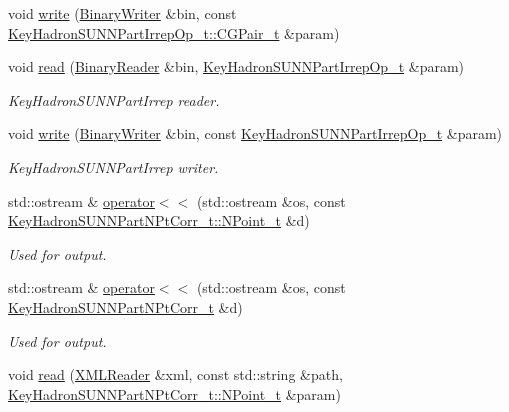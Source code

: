 \begin{DoxyCompactItemize}
\item 
void \mbox{\hyperlink{namespaceHadron_a53c6ec066bb836eb7474a8a18be8fea7}{write}} (\mbox{\hyperlink{classADATIO_1_1BinaryWriter}{Binary\+Writer}} \&bin, const \mbox{\hyperlink{structHadron_1_1KeyHadronSUNNPartIrrepOp__t_1_1CGPair__t}{Key\+Hadron\+S\+U\+N\+N\+Part\+Irrep\+Op\+\_\+t\+::\+C\+G\+Pair\+\_\+t}} \&param)
\item 
void \mbox{\hyperlink{namespaceHadron_a05878acca51117e3c410ba16500c4ba5}{read}} (\mbox{\hyperlink{classADATIO_1_1BinaryReader}{Binary\+Reader}} \&bin, \mbox{\hyperlink{structHadron_1_1KeyHadronSUNNPartIrrepOp__t}{Key\+Hadron\+S\+U\+N\+N\+Part\+Irrep\+Op\+\_\+t}} \&param)
\begin{DoxyCompactList}\small\item\em Key\+Hadron\+S\+U\+N\+N\+Part\+Irrep reader. \end{DoxyCompactList}\item 
void \mbox{\hyperlink{namespaceHadron_a1ab9211268895b4f05c4d46ff18dff6d}{write}} (\mbox{\hyperlink{classADATIO_1_1BinaryWriter}{Binary\+Writer}} \&bin, const \mbox{\hyperlink{structHadron_1_1KeyHadronSUNNPartIrrepOp__t}{Key\+Hadron\+S\+U\+N\+N\+Part\+Irrep\+Op\+\_\+t}} \&param)
\begin{DoxyCompactList}\small\item\em Key\+Hadron\+S\+U\+N\+N\+Part\+Irrep writer. \end{DoxyCompactList}\item 
std\+::ostream \& \mbox{\hyperlink{namespaceHadron_a2559588d0550564638289369a0d3ba30}{operator$<$$<$}} (std\+::ostream \&os, const \mbox{\hyperlink{structHadron_1_1KeyHadronSUNNPartNPtCorr__t_1_1NPoint__t}{Key\+Hadron\+S\+U\+N\+N\+Part\+N\+Pt\+Corr\+\_\+t\+::\+N\+Point\+\_\+t}} \&d)
\begin{DoxyCompactList}\small\item\em Used for output. \end{DoxyCompactList}\item 
std\+::ostream \& \mbox{\hyperlink{namespaceHadron_af2ff7a4948a4b5cdeaabc1de5072918c}{operator$<$$<$}} (std\+::ostream \&os, const \mbox{\hyperlink{structHadron_1_1KeyHadronSUNNPartNPtCorr__t}{Key\+Hadron\+S\+U\+N\+N\+Part\+N\+Pt\+Corr\+\_\+t}} \&d)
\begin{DoxyCompactList}\small\item\em Used for output. \end{DoxyCompactList}\item 
void \mbox{\hyperlink{namespaceHadron_aaef0a2bed7d8dd73e0611d46f68b4ee6}{read}} (\mbox{\hyperlink{classADATXML_1_1XMLReader}{X\+M\+L\+Reader}} \&xml, const std\+::string \&path, \mbox{\hyperlink{structHadron_1_1KeyHadronSUNNPartNPtCorr__t_1_1NPoint__t}{Key\+Hadron\+S\+U\+N\+N\+Part\+N\+Pt\+Corr\+\_\+t\+::\+N\+Point\+\_\+t}} \&param)

\end{DoxyCompactItemize}
